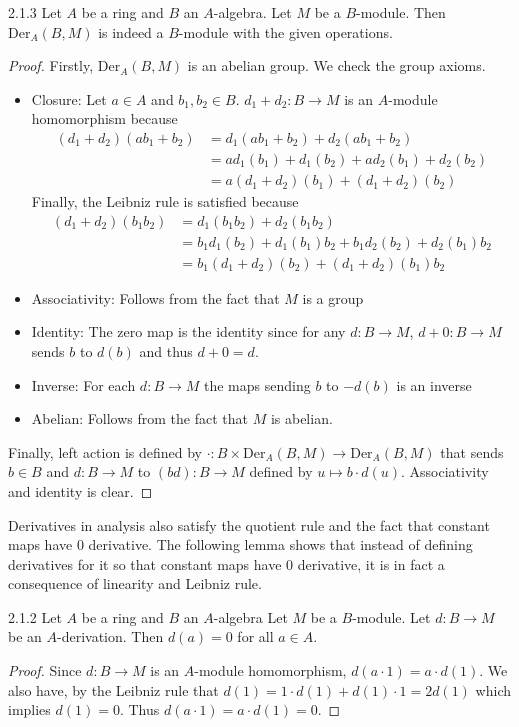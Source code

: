 \documentclass[a4paper]{article}
\begin{document}
\begin{lmm}{}{2.1.3} Let $A$ be a ring and $B$ an $A$-algebra. Let $M$ be a $B$-module. Then $\text{Der}_A(B,M)$ is indeed a $B$-module with the given operations. 
\begin{proof}
Firstly, $\text{Der}_A(B,M)$ is an abelian group. We check the group axioms. 
\begin{itemize}
\item Closure: Let $a\in A$ and $b_1,b_2\in B$. $d_1+d_2:B\to M$ is an $A$-module homomorphism because 
\begin{align*}
(d_1+d_2)(ab_1+b_2)&=d_1(ab_1+b_2)+d_2(ab_1+b_2)\\
&=ad_1(b_1)+d_1(b_2)+ad_2(b_1)+d_2(b_2)\\
&=a(d_1+d_2)(b_1)+(d_1+d_2)(b_2)
\end{align*}
Finally, the Leibniz rule is satisfied because 
\begin{align*}
(d_1+d_2)(b_1b_2)&=d_1(b_1b_2)+d_2(b_1b_2)\\
&=b_1d_1(b_2)+d_1(b_1)b_2+b_1d_2(b_2)+d_2(b_1)b_2\\
&=b_1(d_1+d_2)(b_2)+(d_1+d_2)(b_1)b_2
\end{align*}
\item Associativity: Follows from the fact that $M$ is a group
\item Identity: The zero map is the identity since for any $d:B\to M$, $d+0:B\to M$ sends $b$ to $d(b)$ and thus $d+0=d$. 
\item Inverse: For each $d:B\to M$ the maps sending $b$ to $-d(b)$ is an inverse
\item Abelian: Follows from the fact that $M$ is abelian. 
\end{itemize}
Finally, left action is defined by $\cdot:B\times\text{Der}_A(B,M)\to\text{Der}_A(B,M)$ that sends $b\in B$ and $d:B\to M$ to $(bd):B\to M$ defined by $u\mapsto b\cdot d(u)$. Associativity and identity is clear. 
\end{proof}
\end{lmm}

Derivatives in analysis also satisfy the quotient rule and the fact that constant maps have $0$ derivative. The following lemma shows that instead of defining derivatives for it so that constant maps have $0$ derivative, it is in fact a consequence of linearity and Leibniz rule. 

\begin{lmm}{}{2.1.2} Let $A$ be a ring and $B$ an $A$-algebra Let $M$ be a $B$-module. Let $d:B\to M$ be an $A$-derivation. Then $d(a)=0$ for all $a\in A$. 
\begin{proof}
Since $d:B\to M$ is an $A$-module homomorphism, $d(a\cdot 1)=a\cdot d(1)$. We also have, by the Leibniz rule that $d(1)=1\cdot d(1)+d(1)\cdot 1=2d(1)$ which implies $d(1)=0$. Thus $d(a\cdot 1)=a\cdot d(1)=0$. 
\end{proof}
\end{lmm}
\end{document}
